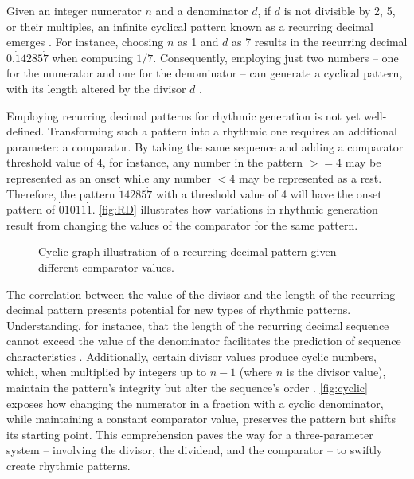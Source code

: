 \documentclass[12pt]{article}
\numberwithin{subsubsubsection}{subsubsection}
\begin{document}
Given an integer numerator $n$ and a denominator $d$, if $d$ is not divisible by 2, 5, or their multiples, an infinite cyclical pattern known as a recurring decimal emerges \cite{Dickson}. For instance, choosing $n$ as 1 and $d$ as 7 results in the recurring decimal $0.\dot{1}4285\dot{7}$ when computing $1/7$. Consequently, employing just two numbers -- one for the numerator and one for the denominator -- can generate a cyclical pattern, with its length altered by the divisor $d$ \cite{Dickson}. 

Employing recurring decimal patterns for rhythmic generation is not yet well-defined. Transforming such a pattern into a rhythmic one requires an additional parameter: a comparator. By taking the same sequence and adding a comparator threshold value of 4, for instance, any number in the pattern $>=4$ may be represented as an onset while any number $<4$ may be represented as a rest. Therefore, the pattern $\dot{1}4285\dot{7}$ with a threshold value of 4 will have the onset pattern of $\dot{0}1011\dot{1}$. \autoref{fig:RD} illustrates how variations in rhythmic generation result from changing the values of the comparator for the same pattern.
\newline



\begin{figure}[ht]
    \centering
    \caption{Cyclic graph illustration of a recurring decimal pattern given different comparator values.}
    \label{fig:RD}
\end{figure}
\newpage



The correlation between the value of the divisor and the length of the recurring decimal pattern \cite{Dickson} presents potential for new types of rhythmic patterns. Understanding, for instance, that the length of the recurring decimal sequence cannot exceed the value of the denominator facilitates the prediction of sequence characteristics \cite{Dickson}. Additionally, certain divisor values produce cyclic numbers, which, when multiplied by integers up to $n-1$ (where $n$ is the divisor value), maintain the pattern's integrity but alter the sequence's order \cite{Gardner}. \autoref{fig:cyclic} exposes how changing the numerator in a fraction with a cyclic denominator, while maintaining a constant comparator value, preserves the pattern but shifts its starting point. This comprehension paves the way for a three-parameter system -- involving the divisor, the dividend, and the comparator -- to swiftly create rhythmic patterns.
\end{document}
